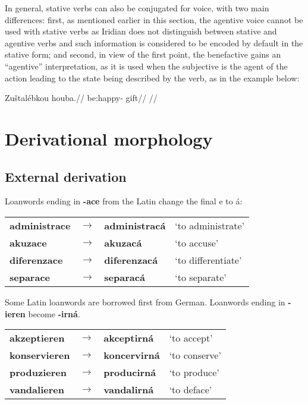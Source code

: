 In general, stative verbs can also be conjugated for voice, with two main differences: first, as mentioned earlier in this section, the agentive voice cannot be used with stative verbs as Iridian does not distinguish between stative and agentive verbs and such information is considered to be encoded by default in the stative form; and second, in view of the first point, the benefactive gains an ``agentive'' interpretation, as it is used when the subjective is the agent of the action leading to the state being described by the verb, as in the example below:

\ex
\begingl
\gla Zuštal\'ebkou houba.//
\glb be:happy- gift//
\glft {}//
\endgl
\xe



\section{Derivational morphology}
\subsection{External derivation}
\par Loanwords ending in \textbf{-ace} from the Latin change the final e to á:
\begin{table}[h!]
	\centering \small
	\begin{tabu} to 0.9
		administrace 	& $\rightarrow$ & administracá 	& `to administrate' \\
		akuzace			& $\rightarrow$ & akuzacá		& `to accuse'\\
		diferenzace		& $\rightarrow$ & diferenzacá	& `to differentiate'\\
		separace		& $\rightarrow$ & separacá		& `to separate'\\
	\end{tabu}
\end{table}
\par Some Latin loanwords are borrowed first from German. Loanwords ending in \textbf{-ieren} become \textbf{-irná}.
\begin{table}[h!]
	\centering \small
	\begin{tabu} to 0.9
		akzeptieren 	& $\rightarrow$ & akceptirná 	& `to accept' \\
		konservieren	& $\rightarrow$ & koncervirná	& `to conserve'\\
		produzieren		& $\rightarrow$ & producirná	& `to produce'\\
		vandalieren		& $\rightarrow$ & vandalirná 	& `to deface'\\
	\end{tabu}
\end{table}
